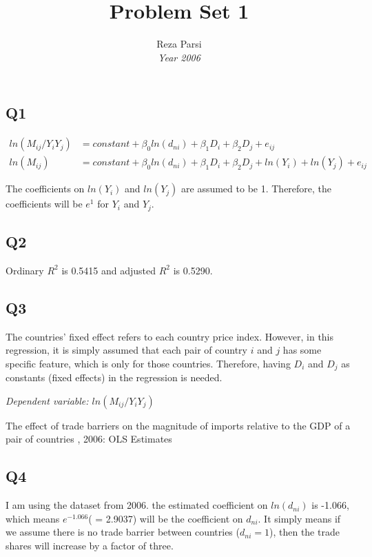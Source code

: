 \documentclass{article}
\begin{document}
\title{Problem Set 1}
\author{Reza Parsi\\ \textit{\small{Year 2006}}}
\maketitle
\subsection*{Q1}
\begin{equation*}
\begin{split}
ln(M_{ij}/Y_i Y_j) &= constant + \beta_0 ln(d_{ni}) + \beta_1 D_i + \beta_2 D_j +  e_{ij} \\
ln(M_{ij}) &= constant + \beta_0 ln(d_{ni}) + \beta_1 D_i + \beta_2 D_j +  ln(Y_i) + ln(Y_j) + e_{ij}
\end{split}
\end{equation*}

The coefficients on $ln(Y_i)$ and $ln(Y_j)$ are assumed to be 1. Therefore, the coefficients will be $e^1$ for $Y_i$ and $Y_j$.

\subsection*{Q2}
Ordinary $R^2$ is 0.5415 and adjusted $R^2$ is 0.5290.

\subsection*{Q3}
The countries' fixed effect refers to each country price index. However, in this regression, it is simply assumed that each pair of country $i$ and $j$ has some specific feature, which is only for those countries. Therefore, having $D_i$ and $D_j$ as constants (fixed effects) in the regression is needed. 



\begin{table}[h]
\textit{\small{Dependent variable: $ln(M_{ij}/Y_i Y_j)$}}
\centering
\caption{\small{The effect of trade barriers on the magnitude of imports relative to the GDP of a pair of countries , 2006: OLS Estimates}}

\label{Table:}
\end{table}

\subsection*{Q4}
I am using the dataset from 2006. the estimated coefficient on $ln(d_{ni})$ is -1.066, which means $e^{-1.066}$( = 2.9037) will be the coefficient on $d_{ni}$. It simply means if we assume there is no trade barrier between countries ($d_{ni} = 1$), then the trade shares will increase by a factor of three. 
\end{document}
